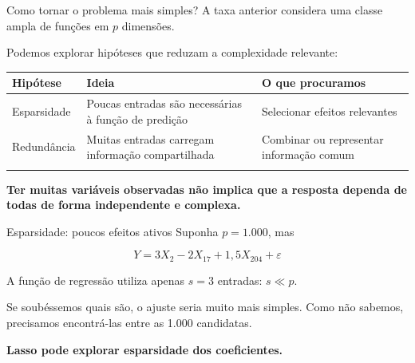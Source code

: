 \documentclass[
  10pt,
  ignorenonframetext,
  aspectratio=169,
  brazilian,
]{beamer}
\newcounter{none} %
\begin{document}
\begin{frame}{Como tornar o problema mais simples?}
\protect{}\label{como-tornar-o-problema-mais-simples}
A taxa anterior considera uma classe ampla de funções em \(p\)
dimensões.

Podemos explorar hipóteses que reduzam a complexidade relevante:

{\def\LTcaptype{none} %
\begin{longtable}[]{@{}
  >{\raggedright\arraybackslash}p{}
  >{\raggedright\arraybackslash}p{}
  >{\raggedright\arraybackslash}p{}@{}}
\toprule\noalign{}
\begin{minipage}[b]{\linewidth}\raggedright
Hipótese
\end{minipage} & \begin{minipage}[b]{\linewidth}\raggedright
Ideia
\end{minipage} & \begin{minipage}[b]{\linewidth}\raggedright
O que procuramos
\end{minipage} \\
\midrule\noalign{}
\endhead
Esparsidade & Poucas entradas são necessárias à função de predição &
Selecionar efeitos relevantes \\
Redundância & Muitas entradas carregam informação compartilhada &
Combinar ou representar informação comum \\
\bottomrule\noalign{}
\end{longtable}
}

\textbf{Ter muitas variáveis observadas não implica que a resposta
dependa de todas de forma independente e complexa.}
\end{frame}

\begin{frame}{Esparsidade: poucos efeitos ativos}
\protect{}\label{esparsidade-poucos-efeitos-ativos}
Suponha \(p=1.000\), mas

\[
Y=3X_2-2X_{17}+1{,}5X_{204}+\varepsilon
\]

A função de regressão utiliza apenas \(s=3\) entradas: \(s\ll p\).

Se soubéssemos quais são, o ajuste seria muito mais simples. Como não
sabemos, precisamos encontrá-las entre as 1.000 candidatas.

\textbf{Lasso pode explorar esparsidade dos coeficientes.}
\end{frame}
\end{document}
